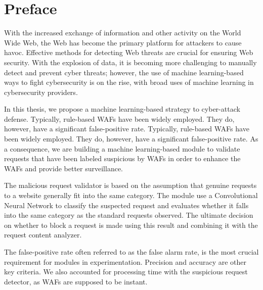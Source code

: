 \chapter*{Preface}
\thispagestyle{fancy}
\label{tom_tat}
\hspace*{5cm}

With the increased exchange of information and other activity on the World Wide Web, the Web has become the primary platform for attackers to cause havoc. Effective methods for detecting Web threats are crucial for ensuring Web security. With the explosion of data, it is becoming more challenging to manually detect and prevent cyber threats; however, the use of machine learning-based ways to fight cybersecurity is on the rise, with broad uses of machine learning in cybersecurity providers. 

In this thesis, we propose a machine learning-based strategy to cyber-attack defense. Typically, rule-based WAFs have been widely employed. They do, however, have a significant false-positive rate. Typically, rule-based WAFs have been widely employed. They do, however, have a significant false-positive rate. As a consequence, we are building a machine learning-based module to validate requests that have been labeled suspicious by WAFs in order to enhance the WAFs and provide better surveillance. 

The malicious request validator is based on the assumption that genuine requests to a website generally fit into the same category. The module use a Convolutional Neural Network to classify the suspected request and evaluates whether it falls into the same category as the standard requests observed. The ultimate decision on whether to block a request is made using this result and combining it with the request content analyzer.


The false-positive rate often referred to as the false alarm rate, is the most crucial requirement for modules in experimentation. Precision and accuracy are other key criteria. We also accounted for processing time with the suspicious request detector, as WAFs are supposed to be instant.
	
\cleardoublepage
